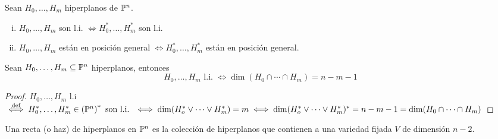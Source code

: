 \begin{defi}
    Sean $H_0, \dots, H_m$ hiperplanos de $\mathbb{P}^n$.
    \begin{enumerate}[(i)]
        \item $H_0, \dots, H_m$ son l.i. $\iff H_0^*, \dots, H_m^*$ son l.i.
        \item $H_0, \dots, H_m$ están en posición general $\iff H_0^*, \dots, H_m^*$ están en posición general.
    \end{enumerate}
\end{defi}

\begin{prop}
    Sean $H_0,\dots,H_m \subseteq \mathbb{P}^n$ hiperplanos, entonces
    \[
        H_0,\dots, H_m \text{ l.i. } \iff \dim(H_0 \cap \cdots \cap H_m) = n - m - 1
    \]
\end{prop}
\begin{proof}
    $H_0,\dots,H_m$ l.i $\stackrel{\text{def}}{\iff} H_0^*,\dots,H_m^* \in \left(\mathbb{P}^n\right)^* \text{ son l.i. }
    \iff \dim(H_o^* \vee \cdots \vee H_m^*) = m \iff \dim(H_o^* \vee \cdots \vee H_m^*)^* = n - m-1
    = \dim(H_0 \cap \cdots \cap H_m)$
\end{proof}

\begin{defi}
    Una recta (o haz) de hiperplanos en $\mathbb{P}^n$ es la colección de hiperplanos que contienen a una variedad
    fijada $V$ de dimensión $n-2$.
\end{defi}


